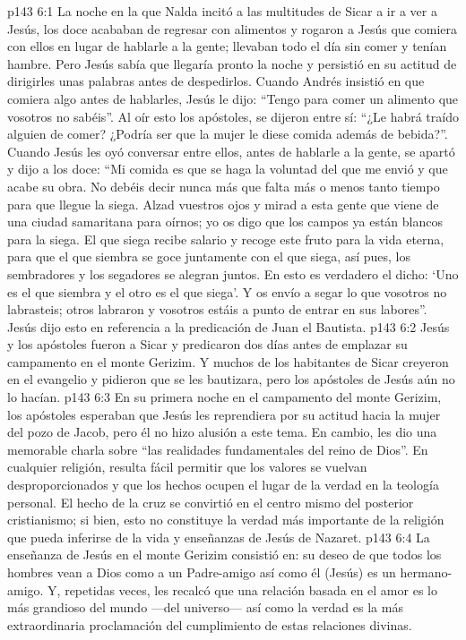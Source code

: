 \vs p143 6:1 La noche en la que Nalda incitó a las multitudes de Sicar a ir a ver a Jesús, los doce acababan de regresar con alimentos y rogaron a Jesús que comiera con ellos en lugar de hablarle a la gente; llevaban todo el día sin comer y tenían hambre. Pero Jesús sabía que llegaría pronto la noche y persistió en su actitud de dirigirles unas palabras antes de despedirlos. Cuando Andrés insistió en que comiera algo antes de hablarles, Jesús le dijo: “Tengo para comer un alimento que vosotros no sabéis”. Al oír esto los apóstoles, se dijeron entre sí: “¿Le habrá traído alguien de comer? ¿Podría ser que la mujer le diese comida además de bebida?”. Cuando Jesús les oyó conversar entre ellos, antes de hablarle a la gente, se apartó y dijo a los doce: “Mi comida es que se haga la voluntad del que me envió y que acabe su obra. No debéis decir nunca más que falta más o menos tanto tiempo para que llegue la siega. Alzad vuestros ojos y mirad a esta gente que viene de una ciudad samaritana para oírnos; yo os digo que los campos ya están blancos para la siega. El que siega recibe salario y recoge este fruto para la vida eterna, para que el que siembra se goce juntamente con el que siega, así pues, los sembradores y los segadores se alegran juntos. En esto es verdadero el dicho: ‘Uno es el que siembra y el otro es el que siega’. Y os envío a segar lo que vosotros no labrasteis; otros labraron y vosotros estáis a punto de entrar en sus labores”. Jesús dijo esto en referencia a la predicación de Juan el Bautista.
\vs p143 6:2 Jesús y los apóstoles fueron a Sicar y predicaron dos días antes de emplazar su campamento en el monte Gerizim. Y muchos de los habitantes de Sicar creyeron en el evangelio y pidieron que se les bautizara, pero los apóstoles de Jesús aún no lo hacían.
\vs p143 6:3 \pc En su primera noche en el campamento del monte Gerizim, los apóstoles esperaban que Jesús les reprendiera por su actitud hacia la mujer del pozo de Jacob, pero él no hizo alusión a este tema. En cambio, les dio una memorable charla sobre “las realidades fundamentales del reino de Dios”. En cualquier religión, resulta fácil permitir que los valores se vuelvan desproporcionados y que los hechos ocupen el lugar de la verdad en la teología personal. El hecho de la cruz se convirtió en el centro mismo del posterior cristianismo; si bien, esto no constituye la verdad más importante de la religión que pueda inferirse de la vida y enseñanzas de Jesús de Nazaret.
\vs p143 6:4 La enseñanza de Jesús en el monte Gerizim consistió en: su deseo de que todos los hombres vean a Dios como a un Padre\hyp{}amigo así como él (Jesús) es un hermano\hyp{}amigo. Y, repetidas veces, les recalcó que una relación basada en el amor es lo más grandioso del mundo ---del universo--- así como la verdad es la más extraordinaria proclamación del cumplimiento de estas relaciones divinas.

